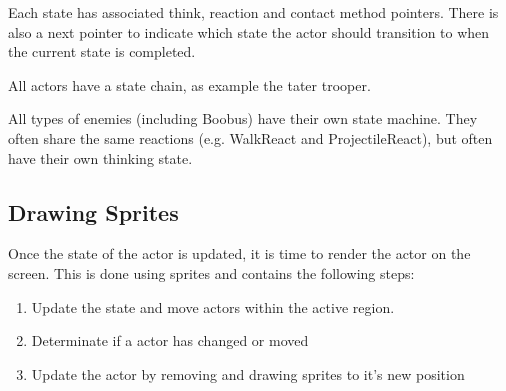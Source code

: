\documentclass[book.tex]{subfiles}
\begin{document}
Each state has associated think, reaction and contact method pointers. There is also a next
pointer to indicate which state the actor should transition to when the current state is completed.\\
\par
\begin{minipage}{\textwidth}
  
\end{minipage}
\label{state_type}
\par

All actors have a state chain, as example the tater trooper.\\
\par
\begin{minipage}{\textwidth}

\end{minipage}
\par
All types of enemies (including Boobus) have their own state machine. They often share
the same reactions (e.g. WalkReact and ProjectileReact), but often have their own thinking state.

\subsection{Drawing Sprites}
\label{section:draw_sprites}
Once the state of the actor is updated, it is time to render the actor on the screen. This is done using sprites and contains the following steps:
\begin{enumerate}
\item Update the state and move actors within the active region.
\item Determinate if a actor has changed or moved
\item Update the actor by removing and drawing sprites to it's new position
\end{enumerate}
\end{document}
